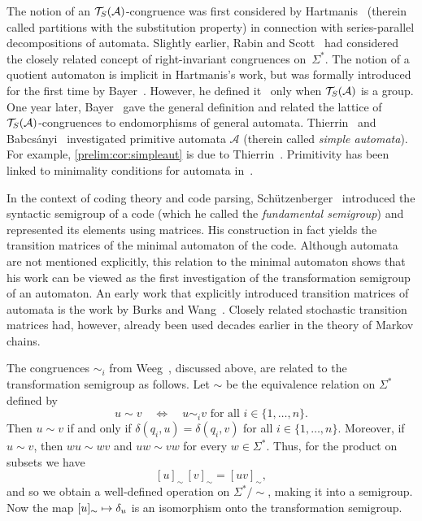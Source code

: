The notion of an $\mathcal T_S(\mathcal A)$-congruence was first
considered by Hartmanis~\cite{DBLP:journals/iandc/Hartmanis60} (therein called
partitions with the substitution property) in connection
with series-parallel decompositions of automata.
Slightly earlier, Rabin and Scott~\cite{DBLP:journals/ibmrd/RabinS59} had considered the closely related concept
of right-invariant congruences on~$\Sigma^*$.
The notion of a quotient automaton
is implicit in Hartmanis's work,
but was formally introduced for the first time
by Bayer~\cite{DBLP:conf/focs/Bayer66}.
However, he defined it~\cite[Def.~9]{DBLP:conf/focs/Bayer66}
only when $\mathcal T_S(\mathcal A)$ is a group.
One year later, Bayer~\cite{DBLP:conf/focs/Bayer67} gave the general definition and related
the lattice of $\mathcal T_S(\mathcal A)$-congruences
to endomorphisms of general automata.
Thierrin~\cite{DBLP:journals/kybernetika/Thierrin70} and Babcs\'anyi~\cite{DBLP:journals/actaC/Babcsanyi07}
investigated primitive automata $\mathcal A$ (therein called \emph{simple automata}).
For example, \cref{prelim:cor:simpleaut}
is due to Thierrin~\cite[Prop.~8]{DBLP:journals/kybernetika/Thierrin70}.
Primitivity has been linked to minimality conditions
for automata in~\cite{DBLP:journals/mst/Davies18,
	DBLP:phd/basesearch/Davies19,
	DBLP:journals/tcs/RestivoV12,
	DBLP:journals/tcs/RestivoV12a}.


In the context of coding theory and code parsing,
Schützenberger~\cite[Sect.~5 \& 6]{DBLP:journals/tit/Schutzenberger56}
introduced the syntactic semigroup of a code (which he called the
\emph{fundamental semigroup}) and represented its elements using matrices.
His construction in fact yields the transition matrices of the minimal
automaton of the code. Although automata are not mentioned explicitly,
this relation to the minimal automaton shows that his work can be viewed
as the first investigation of the transformation semigroup of an automaton.
An early work that explicitly introduced transition matrices of automata 
is the work by Burks and Wang~\cite{DBLP:journals/jacm/BurksW57a}.
Closely related stochastic transition matrices had, however, already been
used decades earlier in the theory of Markov chains.

The congruences $\sim_i$ from
Weeg~\cite[Def.~5]{DBLP:journals/jacm/Weeg62}, discussed above,
are related to the transformation semigroup as follows.
Let $\sim$ be the equivalence relation on $\Sigma^*$ defined by
\[
u \sim v
\quad\Longleftrightarrow\quad
u \sim_i v \text{ for all } i \in \{1,\ldots,n\}.
\]
Then $u \sim v$ if and only if
$\delta(q_i,u)=\delta(q_i,v)$ for all $i\in\{1,\ldots,n\}$.
Moreover, if $u\sim v$, then
$wu\sim wv$ and $uw\sim vw$ for every $w\in\Sigma^*$.
Thus, for the product on subsets we have
\[
[u]_{\sim}\,[v]_{\sim} = [uv]_{\sim},
\]
and so we obtain a well-defined operation on $\Sigma^* / {\sim}$,
making it into a semigroup.
Now the map
$
[u]_{\sim} \mapsto {\delta}_{u}
$
is an isomorphism onto the transformation semigroup.

